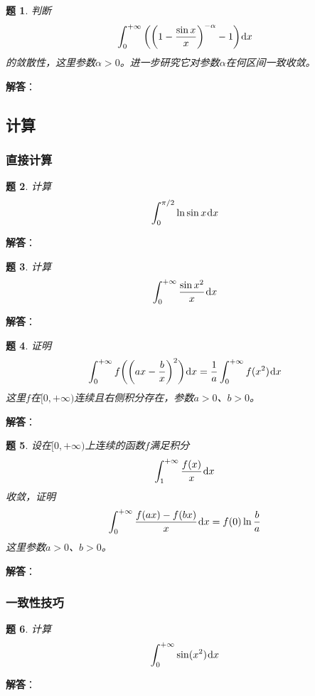 \documentclass[a4paper,UTF8,fontset=windows,AutoFakeBold]{ctexart}
\newcommand*{\dr}{\hspace{0.07em}\mathrm{d}}
\theoremstyle{ex}
\newtheorem{exercise}{题}
\newcommand{\sol}[1]{{\vspace{5pt}\kaishu\noindent\textbf{解答}：\vspace{-3pt}
\begin{compactitem}
    \item[] #1
\end{compactitem}
}}
\begin{document}
\begin{framed}
\begin{exercise}
    判断
    $$\int_0^{+\infty}\bigg(\bigg(1-\frac{\sin x}{x}\bigg)^{-\alpha}-1\bigg)\dr x$$
    的敛散性，这里参数$\alpha>0$。进一步研究它对参数$\alpha$在何区间一致收敛。
\end{exercise}
\sol{

}
\end{framed}

\subsection{计算}
\subsubsection{直接计算}
\begin{framed}
\begin{exercise}
    计算
    $$\int_0^{\pi/2}\ln\sin x\dr x$$
\end{exercise}
\sol{

}
\end{framed}

\begin{framed}
\begin{exercise}
    计算
    $$\int_0^{+\infty}\frac{\sin x^2}{x}\dr x$$
\end{exercise}
\sol{

}
\end{framed}

\begin{framed}
\begin{exercise}
    证明
    $$\int_0^{+\infty}f\bigg(\bigg(ax-\frac{b}{x}\bigg)^2\bigg)\dr x=\frac{1}{a}\int_0^{+\infty}f(x^2)\dr x$$
    这里$f$在$[0,+\infty)$连续且右侧积分存在，参数$a>0$、$b>0$。
\end{exercise}
\sol{

}
\end{framed}

\begin{framed}
\begin{exercise}
    设在$[0,+\infty)$上连续的函数$f$满足积分
    $$\int_1^{+\infty}\frac{f(x)}{x}\dr x$$
    收敛，证明
    $$\int_0^{+\infty}\frac{f(ax)-f(bx)}{x}\dr x=f(0)\ln\frac{b}{a}$$
    这里参数$a>0$、$b>0$。
\end{exercise}
\sol{

}
\end{framed}

\subsubsection{一致性技巧}
\begin{framed}
\begin{exercise}
    计算
    $$\int_0^{+\infty}\sin(x^2)\dr x$$
\end{exercise}
\sol{

}
\end{framed}
\end{document}
